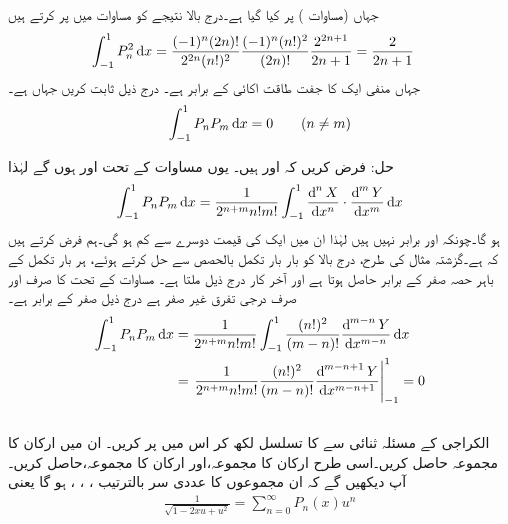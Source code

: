 جہاں   (مساوات ) پر کیا گیا ہے۔درج بالا نتیجے کو مساوات  میں پر کرتے ہیں
 \begin{align}\label{مساوات_طاقتی_لیژانڈر_معیار}
\int_{-1}^{1} P_n^2  \dif x&=\frac{(-1)^n (2n)!}{2^{2n}(n!)^2}\frac{(-1)^n(n!)^2}{(2n)!}\frac{2^{2n+1}}{2n+1}=\frac{2}{2n+1}
\end{align}
جہاں منفی ایک کا جفت طاقت اکائی کے برابر  ہے۔
درج ذیل ثابت کریں جہاں  ہے۔
\begin{align}
\int_{-1}^{1}P_nP_m \dif x=0\quad \quad (n \ne m)
\end{align}

حل: فرض کریں کہ  اور  ہیں۔ یوں مساوات  کے تحت
  اور    ہوں گے لہٰذا
\begin{align*}
\int_{-1}^{1}P_n P_m \dif x=\frac{1}{2^{n+m}n!m!}\int_{-1}^{1} \frac{\dif^{\,n}X}{\dif x^n}\cdot \frac{\dif^{\,m}Y}{\dif x^m}\dif x
\end{align*}
ہو گا۔چونکہ  اور  برابر نہیں ہیں لہٰذا ان میں ایک کی قیمت دوسرے سے کم ہو گی۔ہم فرض کرتے ہیں کہ  ہے۔گزشتہ مثال کی طرح، درج بالا کو بار بار تکمل بالحصص سے حل کرتے ہوئے، ہر بار تکمل کے باہر حصہ صفر کے برابر حاصل ہوتا ہے اور آخر کار درج ذیل ملتا ہے۔ مساوات  کے تحت  کا صرف اور صرف  درجی تفرق غیر صفر ہے درج ذیل صفر کے برابر ہے۔
\begin{align*}
\int_{-1}^{1}P_nP_m\dif x&=\frac{1}{2^{n+m}n!m!}\int_{-1}^{1} \frac{(n!)^2}{(m-n)!}\frac{\dif^{\,m-n}Y}{\dif x^{m-n}}\dif x\\
&=\left. \frac{1}{2^{n+m}n!m!} \frac{(n!)^2}{(m-n)!}\frac{\dif^{\,m-n+1}Y}{\dif x^{m-n+1}}\right|_{-1}^{1}=0
\end{align*}
\quad {}\\
الکراجی کے مسئلہ ثنائی سے  کا تسلسل لکھ کر اس میں  پر کریں۔ ان میں  ارکان کا مجموعہ حاصل کریں۔اسی طرح   ارکان کا مجموعہ،اور  ارکان کا مجموعہ،  حاصل کریں۔آپ دیکھیں گے کہ ان مجموعوں کا عددی سر بالترتیب ، ، ،  ہو گا یعنی
\begin{align}\label{مساوات_بیسل_پیداکار_تفاعل_لیژانڈر}
\frac{1}{\sqrt{1-2xu+u^2}}=\sum_{n=0}^{\infty}P_n(x)u^n
\end{align}

